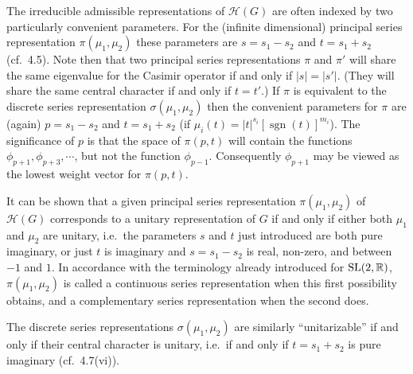 \begin{remark}\label{rem:4.6}

The irreducible admissible representations of $\mathcal{H}(G)$ are often indexed by two particularly convenient parameters. For the (infinite dimensional) principal series representation $\pi(\mu_1, \mu_2)$ these parameters are $s = s_1 - s_2$ and $t = s_1 + s_2$ (cf.\ 4.5). Note then that two principal series representations $\pi$ and $\pi'$ will share the same eigenvalue for the Casimir operator if and only if $|s| = |s'|$. (They will share the same central character if and only if $t = t'$.) If $\pi$ is equivalent to the discrete series representation $\sigma(\mu_1, \mu_2)$ then the convenient parameters for $\pi$ are (again) $p = s_1 - s_2$ and $t = s_1 + s_2$ (if $\mu_i(t) = |t|^{s_i}[\operatorname{sgn}(t)]^{m_i}$). The significance of $p$ is that the space of $\pi(p, t)$ will contain the functions $\phi_{p+1}, \phi_{p+3}, \cdots$, but not the function $\phi_{p-1}$. Consequently $\phi_{p+1}$ may be viewed as the lowest weight vector for $\pi(p, t)$.

\end{remark}

\begin{remark}\label{rem:4.7}

It can be shown that a given principal series representation $\pi(\mu_1, \mu_2)$ of $\mathcal{H}(G)$ corresponds to a unitary representation of $G$ if and only if either both $\mu_1$ and $\mu_2$ are unitary, i.e.\ the parameters $s$ and $t$ just introduced are both pure imaginary, or just $t$ is imaginary and $s = s_1 - s_2$ is real, non-zero, and between $-1$ and $1$. In accordance with the terminology already introduced for $\operatorname{SL}(2,\mathbb{R})$, $\pi(\mu_1, \mu_2)$ is called a continuous series representation when this first possibility obtains, and a complementary series representation when the second does.

The discrete series representations $\sigma(\mu_1, \mu_2)$ are similarly ``unitarizable'' if and only if their central character is unitary, i.e.\ if and only if $t = s_1 + s_2$ is pure imaginary (cf.\ 4.7(vi)).

\end{remark}

